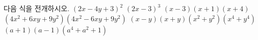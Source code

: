 다음 식을 전개하시오.
 $(2x-4y+3)^2$
 $(2x-3)^3$
 $(x-3)(x+1)(x+4)$
 $(4x^2+6xy+9y^2)(4x^2-6xy+9y^2)$
 $(x-y)(x+y)(x^2+y^2)(x^4+y^4)$
 $(a+1)(a-1)(a^4+a^2+1)$
